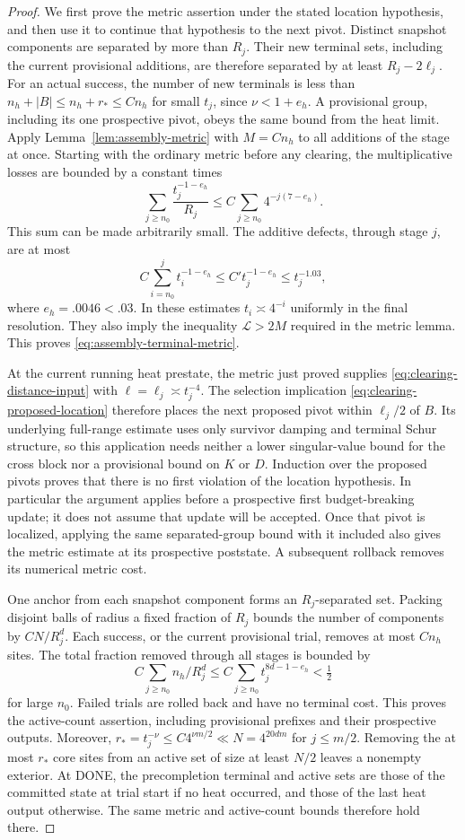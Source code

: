 \begin{proof}
We first prove the metric assertion under the stated location hypothesis,
and then use it to continue that hypothesis to the next pivot.
Distinct snapshot components are separated by more than $R_j$.
Their new terminal sets, including the current provisional additions,
are therefore separated by at least $R_j-2\ell_j$. For an actual success,
the number of new terminals is less than $n_h+|B|\le n_h+r_*\le Cn_h$
for small $t_j$, since $\nu<1+e_h$. A provisional group, including its
one prospective pivot, obeys the same bound from the heat limit.
Apply Lemma~\ref{lem:assembly-metric} with $M=Cn_h$ to all additions of
the stage at once. Starting with the ordinary metric before any clearing,
the multiplicative losses are bounded by a constant times
\[
 \sum_{j\ge n_0}\frac{t_j^{-1-e_h}}{R_j}
 \le C\sum_{j\ge n_0}4^{-j(7-e_h)}.
\]
This sum can be made arbitrarily small. The additive defects, through
stage $j$, are at most
\[
 C\sum_{i=n_0}^j t_i^{-1-e_h}
 \le C't_j^{-1-e_h}\le t_j^{-1.03},
\]
where $e_h=.0046<.03$. In these estimates $t_i\asymp4^{-i}$ uniformly
in the final resolution. They also imply the inequality $\mathcal L>2M$
required in the metric lemma. This proves
\eqref{eq:assembly-terminal-metric}.

At the current running heat prestate, the metric just proved supplies
\eqref{eq:clearing-distance-input} with $\ell=\ell_j\asymp t_j^{-4}$.
The selection implication \eqref{eq:clearing-proposed-location} therefore
places the next proposed pivot within $\ell_j/2$ of $B$. Its underlying
full-range estimate uses only survivor damping and terminal Schur structure,
so this application needs neither a lower singular-value bound for the
cross block nor a provisional bound on $K$ or $D$.
Induction over the proposed pivots proves that there is no first
violation of the location hypothesis. In particular the argument
applies before a prospective first budget-breaking update; it does not
assume that update will be accepted.
Once that pivot is localized, applying the same separated-group bound
with it included also gives the metric estimate at its prospective
poststate. A subsequent rollback removes its numerical metric cost.

One anchor from each snapshot component forms an $R_j$-separated set.
Packing disjoint balls of radius a fixed fraction of $R_j$ bounds the
number of components by $CN/R_j^d$. Each success, or the current
provisional trial, removes at most $Cn_h$ sites. The total fraction
removed through all stages is bounded by
\[
 C\sum_{j\ge n_0}n_h/R_j^d
 \le C\sum_{j\ge n_0}t_j^{8d-1-e_h}<\tfrac12
\]
for large $n_0$. Failed trials are rolled back and have no terminal
cost. This proves the active-count assertion, including provisional
prefixes and their prospective outputs. Moreover,
$r_*=t_j^{-\nu}\le C4^{\nu m/2}\ll N=4^{20dm}$ for $j\le m/2$.
Removing the at most $r_*$ core sites from an active set of size at least
$N/2$ leaves a nonempty exterior.
At DONE, the precompletion terminal and active sets are those of the
committed state at trial start if no heat occurred, and those of the last
heat output otherwise. The same metric and active-count bounds therefore
hold there.


\end{proof}
